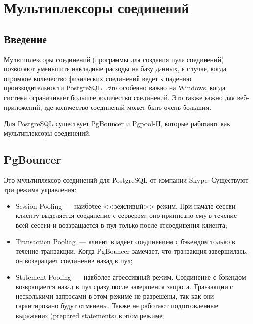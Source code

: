 \chapter{Мультиплексоры соединений}

\begin{epigraphs}
\end{epigraphs}

\section{Введение}

Мультиплексоры соединений (программы для создания пула соединений) позволяют уменьшить накладные расходы на базу данных, в случае, когда огромное количество физических соединений ведет к падению производительности PostgreSQL. Это особенно важно на Windows, когда система ограничивает большое количество соединений. Это также важно для веб-приложений, где количество соединений может быть очень большим.

Для PostgreSQL существует PgBouncer и Pgpool-II, которые работают как мультиплексоры соединений.

\section{PgBouncer}

Это мультиплексор соединений для PostgreSQL от компании Skype. Существуют три режима управления:

\begin{itemize}
  \item Session Pooling~--- наиболее <<вежливый>> режим. При начале сессии клиенту выделяется соединение с сервером; оно приписано ему в течение всей сессии и возвращается в пул только после отсоединения клиента;
  \item Transaction Pooling~--- клиент владеет соединением с бэкендом только в течение транзакции. Когда PgBouncer замечает, что транзакция завершилась, он возвращает соединение назад в пул;
  \item Statement Pooling~--- наиболее агрессивный режим. Соединение с бэкендом возвращается назад в пул сразу после завершения запроса. Транзакции с несколькими запросами в этом режиме не разрешены, так как они гарантировано будут отменены. Также не работают подготовленные выражения (prepared statements) в этом режиме;
\end{itemize}

